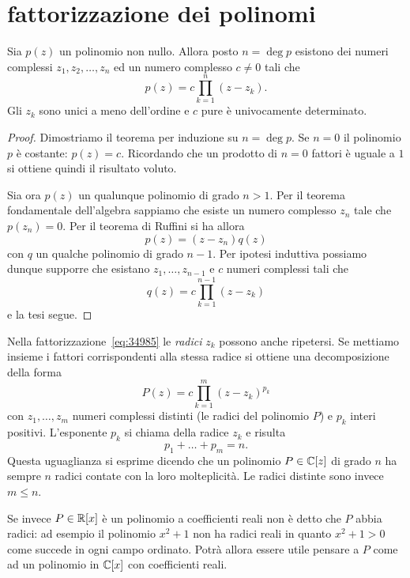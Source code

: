 \section{fattorizzazione dei polinomi}

\begin{theorem}
%
%
%
Sia $p(z)$ un polinomio non nullo. Allora posto $n=\deg p$ esistono dei numeri complessi $z_1, z_2, \dots, z_n$ ed un numero complesso $c\neq 0$ tali che
\begin{equation}\label{eq:34985}
  p(z) = c \prod_{k=1}^n (z-z_k).
\end{equation}
Gli $z_k$ sono unici a meno dell'ordine e $c$ pure è univocamente determinato.
\end{theorem}
%
\begin{proof}
Dimostriamo il teorema per induzione su $n=\deg p$. Se $n=0$ il polinomio $p$ è costante: $p(z) = c$. Ricordando che un prodotto di $n=0$ fattori è uguale a $1$ si ottiene quindi il risultato voluto.

Sia ora $p(z)$ un qualunque polinomio di grado $n>1$. Per il teorema fondamentale dell'algebra sappiamo che esiste un numero complesso $z_n$ tale che $p(z_n)=0$. Per il teorema di Ruffini si ha allora
\[
  p(z) = (z-z_n) q(z)
\]
con $q$ un qualche polinomio di grado $n-1$. Per ipotesi induttiva possiamo dunque supporre che esistano $z_1, \dots, z_{n-1}$ e $c$ numeri complessi tali che
\[
   q(z) = c \prod_{k=1}^{n-1} (z-z_k)
\]
e la tesi segue.
\end{proof}

Nella fattorizzazione~\eqref{eq:34985} le \emph{radici} $z_k$ possono
anche ripetersi. Se mettiamo insieme i fattori corrispondenti alla stessa radice
si ottiene una decomposizione della forma
\begin{equation}\label{eq:358925}
P(z) = c \prod_{k=1}^m (z-z_k)^{p_k}
\end{equation}
con $z_1, \dots, z_m$ numeri complessi distinti (le radici del polinomio $P$)
e $p_k$ interi positivi.
L'esponente $p_k$ si chiama
 della radice $z_k$ e risulta
\[
  p_1 + \dots + p_m = n.
\]
Questa uguaglianza si esprime dicendo che un polinomio $P\in \mathbb C[z]$
di grado $n$ ha sempre $n$ radici contate con la loro molteplicità.
Le radici distinte sono invece $m\le n$.

Se invece $P\in \mathbb R[x]$ è un polinomio a coefficienti reali
non è detto che $P$ abbia radici: ad esempio il
polinomio $x^2+1$ non ha radici reali in quanto $x^2+1>0$
come succede in ogni campo ordinato.
Potrà allora essere utile pensare a $P$ come ad un polinomio
in $\mathbb C[x]$ con coefficienti reali.

